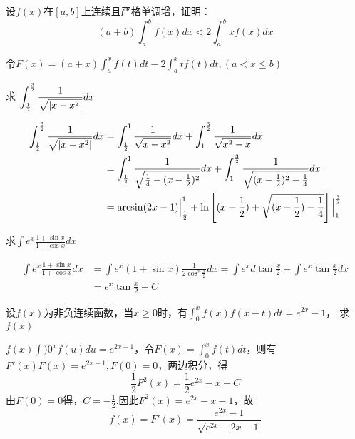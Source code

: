 \documentclass{article}
\begin{document}
\begin{examplle}[]
设\(f(x)\)在\([a,b]\)上连续且严格单调增，证明：
\begin{equation*}
(a+b)\int_a^bf(x)dx<2\int_a^bxf(x)dx
\end{equation*}

令\(F(x)=(a+x)\int^x_af(t)dt-2\int_a^xtf(t)dt,(a<x\le b)\)
\end{examplle}

\begin{examplle}[]
求
\(\displaystyle\int_{\frac{1}{2}}^{\frac{3}{2}}\frac{1}{\sqrt{\abs{x-x^2}}}dx\)

\begin{align*}
\int_{\frac{1}{2}}^{\frac{3}{2}}\frac{1}{\sqrt{\abs{x-x^2}}}dx&=
\int_{\frac{1}{2}}^1\frac{1}{\sqrt{x-x^2}}dx+
\int_{1}^{\frac{3}{2}}\frac{1}{\sqrt{x^2-x}}dx\\
&=\int_{\frac{1}{2}}^1\frac{1}{\sqrt{\frac{1}{4}-(x-\frac{1}{2})^2}}dx+
\int_{1}^{\frac{3}{2}}\frac{1}{\sqrt{(x-\frac{1}{2})^2-\frac{1}{4}}}dx\\
&=\arcsin(2x-1)\Big\rvert^1_{\frac{1}{2}}+\ln\left[
(x-\frac{1}{2})+\sqrt{(x-\frac{1}{2})-\frac{1}{4}}
\right]\Big\rvert^{\frac{3}{2}}_1
\end{align*}
\end{examplle}

\begin{examplle}[]
求\(\displaystyle\int e^x\frac{1+\sin x}{1+\cos x}dx\)

\begin{align*}
\int e^x\frac{1+\sin x}{1+\cos x}dx&=\int e^x(1+\sin x)\frac{1}{2\cos^2\frac{x}{2}}dx=
\int e^xd\tan\frac{x}{2}+\int e^x\tan\frac{x}{2}dx\\
&=e^x\tan\frac{x}{2}+C
\end{align*}
\end{examplle}

\begin{examplle}[]
设\(f(x)\)为非负连续函数，当\(x\ge0\)时，有\(\int_0^xf(x)f(x-t)dt=e^{2x}-1\)，
求\(f(x)\)

\(f(x)\int)0^xf(u)du=e^{2x-1}\)，令\(F(x)=\int_0^xf(t)dt\)，则有
\(F'(x)F(x)=e^{2x-1},F(0)=0\)，两边积分，得
\begin{equation*}
\frac{1}{2}F^2(x)=\frac{1}{2}e^{2x}-x+C
\end{equation*}
由\(F(0)=0\)得，\(C=-\frac{1}{2}\).因此\(F^2(x)=e^{2x}-x-1\)，故
\begin{equation*}
f(x)=F'(x)=\frac{e^{2x}-1}{\sqrt{e^{2x}-2x-1}}
\end{equation*}
\end{examplle}
\end{document}
